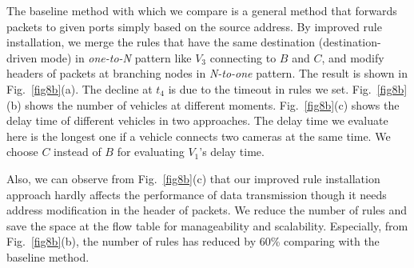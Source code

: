 \documentclass[journal]{IEEEtran}
\begin{document}
The baseline method with which we compare is a general method that forwards packets to given ports simply based on the source address. By improved rule installation, we merge the rules that have the same destination (destination-driven mode) in \textit{one-to-N} pattern like $V_{3}$ connecting to $B$ and $C$, and modify headers of packets at branching nodes in \textit{N-to-one} pattern. The result is shown in Fig.~\ref{fig8b}(a). The decline at $t_{4}$ is due to the timeout in rules we set. Fig.~\ref{fig8b}(b) shows the number of vehicles at different moments. Fig.~\ref{fig8b}(c) shows the delay time of different vehicles in two approaches. The delay time we evaluate here is the longest one if a vehicle connects two cameras at the same time. We choose $C$ instead of $B$ for evaluating $V_{1}$'s delay time.

Also, we can observe from Fig.~\ref{fig8b}(c) that our improved rule installation approach hardly affects the performance of data transmission though it needs address modification in the header of packets. We reduce the number of rules and save the space at the flow table for manageability and scalability. Especially, from Fig.~\ref{fig8b}(b), the number of rules has reduced by 60\% comparing with the baseline method.
\end{document}
